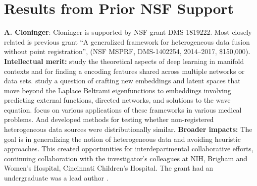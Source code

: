 
\section{Results from Prior NSF Support }

{\bf A. Cloninger}: Cloninger is  supported by NSF grant DMS-1819222.  Most closely related is previous grant ``A generalized framework for heterogeneous data fusion without point registration'', (NSF MSPRF, DMS-1402254, 2014--2017, \$150,000). %
{\bf Intellectual merit:} \cite{mishne2017diffusion,cloninger2018bigeometric,shaham2018provable} study the theoretical aspects of deep learning in manifold contexts and for finding a encoding features shared across multiple networks or data sets.  \cite{cloninger2017spectral, cloninger2017note, cloninger2017prediction} study a question of crafting new embeddings and latent spaces that move beyond the Laplace Beltrami eigenfunctions to embeddings involving predicting external functions, directed networks, and solutions to the wave equation.%
\cite{cloninger2016function, downing2017describing, bates2017outcome, katzman2018deepsurv} focus on various applications of these frameworks in various medical problems.  And \cite{cheng2017two,cloninger2018people} developed methods for testing whether non-registered heterogeneous data sources were distributionally similar.
{\bf Broader impacts:}
The goal is in generalizing the notion of heterogeneous data and avoiding heuristic approaches.  This created opportunities for interdepartmental collaborative efforts, continuing collaboration with the investigator's colleagues at NIH, Brigham and Women's Hospital, Cincinnati Children's Hospital. %
The grant had an undergraduate was a lead author \cite{katzman2018deepsurv}.



